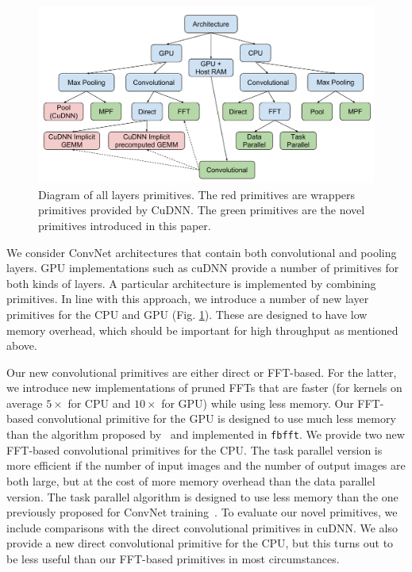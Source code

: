 \documentclass[conference]{./IEEEtran}
\begin{document}
  \begin{figure}
    \begin{center}
      \includegraphics[width=0.79\columnwidth]{alllayersram.pdf}
    \end{center}
    \caption{Diagram of all layers primitives.  The red primitives are
      wrappers primitives provided by CuDNN.  The green primitives are
      the novel primitives introduced in this paper.}
    \label{fig:layers}
  \end{figure}

  We consider ConvNet architectures that contain both convolutional
  and pooling layers.  GPU implementations such as cuDNN provide a
  number of primitives for both kinds of layers.  A particular
  architecture is implemented by combining primitives.  In line with
  this approach, we introduce a number of new layer primitives for the
  CPU and GPU (Fig. \ref{fig:layers}).  These are designed to have low
  memory overhead, which should be important for high throughput as
  mentioned above.

  Our new convolutional primitives are either direct or FFT-based.
  For the latter, we introduce new implementations of pruned FFTs that
  are faster (for kernels on average $5\times$ for CPU and $10\times$
  for GPU) while using less memory.  Our FFT-based convolutional
  primitive for the GPU is designed to use much less memory than the
  algorithm proposed by~\cite{mathieu-iclr-14,vasilache2014fast} and
  implemented in {\tt fbfft}.  We provide two new FFT-based
  convolutional primitives for the CPU. The task parallel version is
  more efficient if the number of input images and the number of
  output images are both large, but at the cost of more memory
  overhead than the data parallel version.  The task parallel
  algorithm is designed to use less memory than the one previously
  proposed for ConvNet training~\cite{zlateski2015znn}.  To evaluate
  our novel primitives, we include comparisons with the direct
  convolutional primitives in cuDNN.  We also provide a new direct
  convolutional primitive for the CPU, but this turns out to be less
  useful than our FFT-based primitives in most circumstances.
\end{document}
